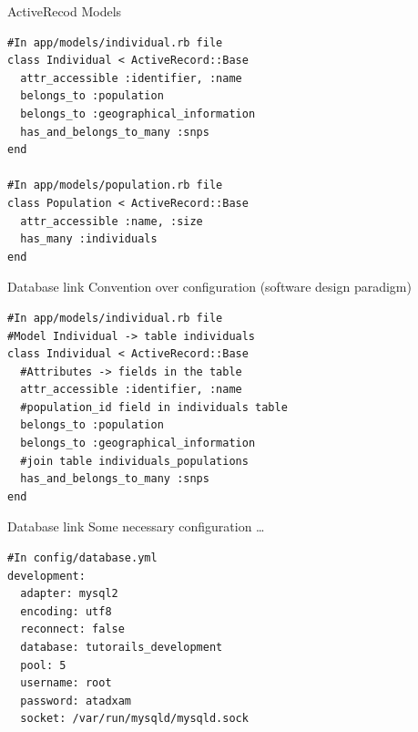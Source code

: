 \documentclass[12pt]{beamer}
\begin{document}

\begin{frame}[fragile]
  \begin{block}{ActiveRecod Models}
	\begin{verbatim}
#In app/models/individual.rb file
class Individual < ActiveRecord::Base
  attr_accessible :identifier, :name
  belongs_to :population
  belongs_to :geographical_information
  has_and_belongs_to_many :snps
end

#In app/models/population.rb file
class Population < ActiveRecord::Base
  attr_accessible :name, :size
  has_many :individuals
end
	\end{verbatim}
  \end{block} 
\end{frame}

\begin{frame}[fragile]
  \begin{block}{Database link}
  	Convention over configuration (software design paradigm)
	\begin{verbatim}
#In app/models/individual.rb file
#Model Individual -> table individuals
class Individual < ActiveRecord::Base
  #Attributes -> fields in the table
  attr_accessible :identifier, :name
  #population_id field in individuals table
  belongs_to :population 
  belongs_to :geographical_information
  #join table individuals_populations
  has_and_belongs_to_many :snps
end
	\end{verbatim}
  \end{block} 
\end{frame}

\begin{frame}[fragile]
  \begin{block}{Database link}
  	Some necessary configuration \ldots
	\begin{verbatim}
#In config/database.yml
development:
  adapter: mysql2
  encoding: utf8
  reconnect: false
  database: tutorails_development
  pool: 5
  username: root
  password: atadxam
  socket: /var/run/mysqld/mysqld.sock
	\end{verbatim}
  \end{block} 
\end{frame}
\end{document}
